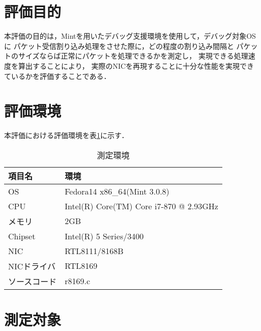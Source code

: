 \documentclass[12pt]{jsarticle}
\begin{document}
\section{評価目的}

本評価の目的は，Mintを用いたデバッグ支援環境を使用して，デバッグ対象OSに
パケット受信割り込み処理をさせた際に，どの程度の割り込み間隔と
パケットのサイズならば正常にパケットを処理できるかを測定し，
実現できる処理速度を算出することにより，
実際のNICを再現することに十分な性能を実現できているかを評価することである．

\section{評価環境}

本評価における評価環境を表\ref{environment}に示す．

\begin{table}[h]
    \caption{測定環境}
    \label{environment}
    \begin{center}
        \begin{tabular}{l|l}   \hline \hline 
            項目名      & 環境                                    \\ \hline
            OS          & Fedora14 x86\_64(Mint 3.0.8)            \\ 
            CPU         & Intel(R) Core(TM) Core i7-870 @ 2.93GHz \\
            メモリ      & 2GB                                     \\
            Chipset     & Intel(R) 5 Series/3400                  \\
            NIC         & RTL8111/8168B                           \\
            NICドライバ & RTL8169                                 \\ 
            ソースコード& r8169.c                                 \\ \hline
        \end{tabular}
    \end{center}
\end{table}

\section{測定対象}
\end{document}
